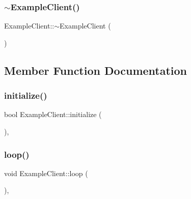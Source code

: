 \hypertarget{classExampleClient_abdca7dbe5fdab81d7d661a677e5ccd14}{}\label{classExampleClient_abdca7dbe5fdab81d7d661a677e5ccd14} 
\subsubsection{\texorpdfstring{$\sim$\+Example\+Client()}{~ExampleClient()}}
{\footnotesize\ttfamily Example\+Client\+::$\sim$\+Example\+Client (\begin{DoxyParamCaption}{ }\end{DoxyParamCaption})\hspace{0.3cm}{\ttfamily [virtual]}}



\subsection{Member Function Documentation}
\hypertarget{classExampleClient_ad504d1d87997fc95bfeca6aa925a4fa6}{}\label{classExampleClient_ad504d1d87997fc95bfeca6aa925a4fa6} 
\subsubsection{\texorpdfstring{initialize()}{initialize()}}
{\footnotesize\ttfamily bool Example\+Client\+::initialize (\begin{DoxyParamCaption}{ }\end{DoxyParamCaption})\hspace{0.3cm}{\ttfamily [protected]}, {\ttfamily [virtual]}}

\hypertarget{classExampleClient_afb58f3425aafe2d4c38195cb3c667dbc}{}\label{classExampleClient_afb58f3425aafe2d4c38195cb3c667dbc} 
\subsubsection{\texorpdfstring{loop()}{loop()}}
{\footnotesize\ttfamily void Example\+Client\+::loop (\begin{DoxyParamCaption}{ }\end{DoxyParamCaption})\hspace{0.3cm}{\ttfamily [protected]}, {\ttfamily [virtual]}}

